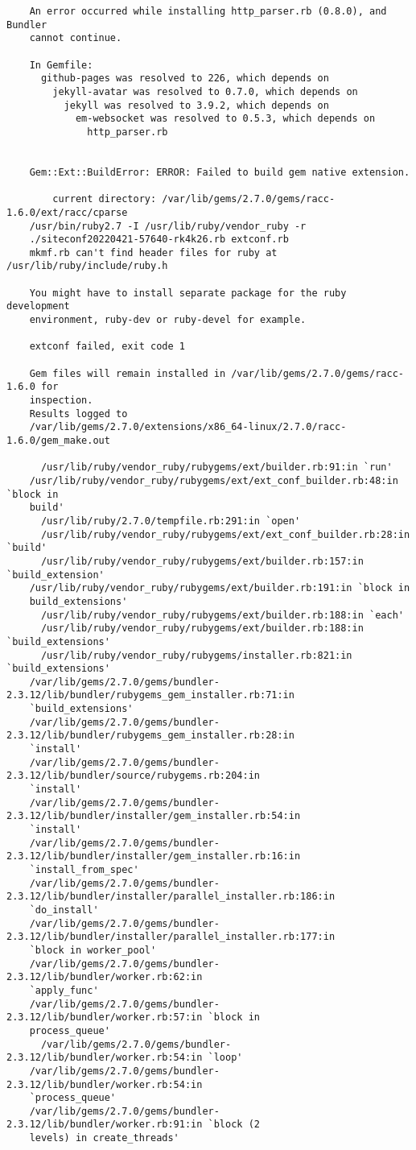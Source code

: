 \documentclass{article}
\numberwithin{equation}{section}
\begin{document}
\begin{verbatim}
	An error occurred while installing http_parser.rb (0.8.0), and Bundler
	cannot continue.
	
	In Gemfile:
	  github-pages was resolved to 226, which depends on
	    jekyll-avatar was resolved to 0.7.0, which depends on
	      jekyll was resolved to 3.9.2, which depends on
	        em-websocket was resolved to 0.5.3, which depends on
	          http_parser.rb
	
	
	Gem::Ext::BuildError: ERROR: Failed to build gem native extension.
	
	    current directory: /var/lib/gems/2.7.0/gems/racc-1.6.0/ext/racc/cparse
	/usr/bin/ruby2.7 -I /usr/lib/ruby/vendor_ruby -r
	./siteconf20220421-57640-rk4k26.rb extconf.rb
	mkmf.rb can't find header files for ruby at /usr/lib/ruby/include/ruby.h
	
	You might have to install separate package for the ruby development
	environment, ruby-dev or ruby-devel for example.
	
	extconf failed, exit code 1
	
	Gem files will remain installed in /var/lib/gems/2.7.0/gems/racc-1.6.0 for
	inspection.
	Results logged to
	/var/lib/gems/2.7.0/extensions/x86_64-linux/2.7.0/racc-1.6.0/gem_make.out
	
	  /usr/lib/ruby/vendor_ruby/rubygems/ext/builder.rb:91:in `run'
	/usr/lib/ruby/vendor_ruby/rubygems/ext/ext_conf_builder.rb:48:in `block in
	build'
	  /usr/lib/ruby/2.7.0/tempfile.rb:291:in `open'
	  /usr/lib/ruby/vendor_ruby/rubygems/ext/ext_conf_builder.rb:28:in `build'
	  /usr/lib/ruby/vendor_ruby/rubygems/ext/builder.rb:157:in `build_extension'
	/usr/lib/ruby/vendor_ruby/rubygems/ext/builder.rb:191:in `block in
	build_extensions'
	  /usr/lib/ruby/vendor_ruby/rubygems/ext/builder.rb:188:in `each'
	  /usr/lib/ruby/vendor_ruby/rubygems/ext/builder.rb:188:in `build_extensions'
	  /usr/lib/ruby/vendor_ruby/rubygems/installer.rb:821:in `build_extensions'
	/var/lib/gems/2.7.0/gems/bundler-2.3.12/lib/bundler/rubygems_gem_installer.rb:71:in
	`build_extensions'
	/var/lib/gems/2.7.0/gems/bundler-2.3.12/lib/bundler/rubygems_gem_installer.rb:28:in
	`install'
	/var/lib/gems/2.7.0/gems/bundler-2.3.12/lib/bundler/source/rubygems.rb:204:in
	`install'
	/var/lib/gems/2.7.0/gems/bundler-2.3.12/lib/bundler/installer/gem_installer.rb:54:in
	`install'
	/var/lib/gems/2.7.0/gems/bundler-2.3.12/lib/bundler/installer/gem_installer.rb:16:in
	`install_from_spec'
	/var/lib/gems/2.7.0/gems/bundler-2.3.12/lib/bundler/installer/parallel_installer.rb:186:in
	`do_install'
	/var/lib/gems/2.7.0/gems/bundler-2.3.12/lib/bundler/installer/parallel_installer.rb:177:in
	`block in worker_pool'
	/var/lib/gems/2.7.0/gems/bundler-2.3.12/lib/bundler/worker.rb:62:in
	`apply_func'
	/var/lib/gems/2.7.0/gems/bundler-2.3.12/lib/bundler/worker.rb:57:in `block in
	process_queue'
	  /var/lib/gems/2.7.0/gems/bundler-2.3.12/lib/bundler/worker.rb:54:in `loop'
	/var/lib/gems/2.7.0/gems/bundler-2.3.12/lib/bundler/worker.rb:54:in
	`process_queue'
	/var/lib/gems/2.7.0/gems/bundler-2.3.12/lib/bundler/worker.rb:91:in `block (2
	levels) in create_threads'
	

\end{verbatim}
\end{document}
